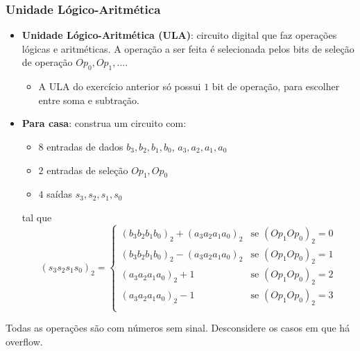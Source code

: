 \documentclass{beamer}
\begin{document}
\begin{frame}
\frametitle{Unidade Lógico-Aritmética}

\begin{itemize}
\item \textbf{Unidade Lógico-Aritmética (ULA)}: circuito digital
que faz operações lógicas e aritméticas. A operação a ser
feita é selecionada pelos bits de seleção de operação
$Op_0, Op_1, \ldots$.
\begin{itemize}
\item A ULA do exercício anterior só possui $1$ bit de operação,
para escolher entre soma e subtração.
\end{itemize}
\end{itemize}

\pause

\begin{itemize}
\item \textbf{Para casa}: construa um circuito com:
\begin{itemize}
\item $8$ entradas de dados $b_3, b_2, b_1, b_0$, $a_3, a_2, a_1, a_0$
\item $2$ entradas de seleção $Op_1, Op_0$
\item $4$ saídas $s_3, s_2, s_1, s_0$
\end{itemize}
tal que $$
(s_3 s_2 s_1 s_0)_2 = \left\{
\begin{array}{ll}
(b_3 b_2 b_1 b_0)_2 + (a_3 a_2 a_1 a_0)_2 & \text{se } (Op_1 Op_0)_2 = 0 \\
(b_3 b_2 b_1 b_0)_2 - (a_3 a_2 a_1 a_0)_2 & \text{se } (Op_1 Op_0)_2 = 1 \\
(a_3 a_2 a_1 a_0)_2 + 1 & \text{se } (Op_1 Op_0)_2 = 2 \\
(a_3 a_2 a_1 a_0)_2 - 1 & \text{se } (Op_1 Op_0)_2 = 3 \\
\end{array}
\right.
$$
\end{itemize}
Todas as operações são com números sem sinal. Desconsidere os casos em que há overflow.

\end{frame}
\end{document}
